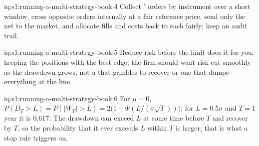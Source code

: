 \begin{solution}{iq:s1:running-a-multi-strategy-book:4}
Collect ' orders by instrument over a short window, cross opposite orders internally at a fair reference price, send only the net to the market, and
allocate fills and costs back to each  fairly; keep an audit trail.
\end{solution}

\begin{solution}{iq:s1:running-a-multi-strategy-book:5}
Reduce risk before the limit does it for you, keeping the positions with the best edge; the firm should want risk cut smoothly as the drawdown grows,
not a  that gambles to recover or one that dumps everything at the line.
\end{solution}

\begin{solution}{iq:s1:running-a-multi-strategy-book:6}
For $\mu = 0$, $P(D_T > L) = P(|W_T| > L) = 2\big(1 - \Phi(L/(\sigma\sqrt{T}))\big)$; for $L = 0.5\sigma$ and $T = 1$ year it is 0.617. The drawdown can
exceed $L$ at some time before $T$ and recover by $T$, so the probability that it ever exceeds $L$ within $T$ is larger; that is what a stop rule
triggers on.
\end{solution}
